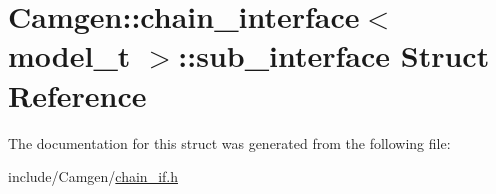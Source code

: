 \hypertarget{a00525}{}\section{Camgen\+:\+:chain\+\_\+interface$<$ model\+\_\+t $>$\+:\+:sub\+\_\+interface Struct Reference}
\label{a00525}


The documentation for this struct was generated from the following file\+:\begin{DoxyCompactItemize}
\item 
include/\+Camgen/\hyperlink{a00608}{chain\+\_\+if.\+h}\end{DoxyCompactItemize}
